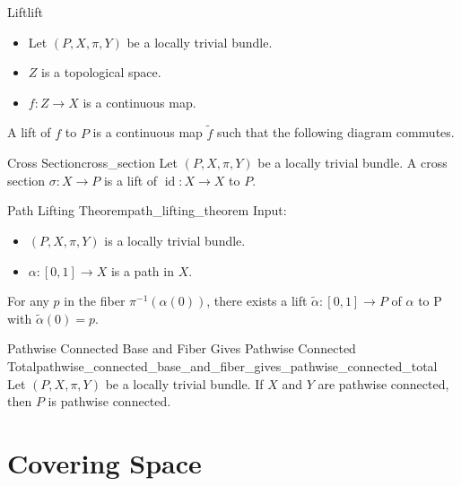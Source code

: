 \documentclass{article}
\begin{document}
\begin{definition}{Lift}{lift}
    \begin{itemize}
        \item Let $(P,X,\pi,Y)$ be a locally trivial bundle.
        \item $Z$ is a topological space.
        \item $f:Z\rightarrow X$ is a continuous map.
    \end{itemize}
    A lift of $f$ to $P$ is a continuous map $\tilde{f}$ such that the following diagram commutes.
    \begin{center}
    \end{center}
\end{definition}

\begin{definition}{Cross Section}{cross_section}
    Let $(P,X,\pi,Y)$ be a locally trivial bundle.
    A cross section $\sigma:X\rightarrow P$ is a lift of $\operatorname{id}:X\rightarrow X$ to $P$.
\end{definition}

\begin{theorem}{Path Lifting Theorem}{path_lifting_theorem}
    Input:
    \begin{itemize}
        \item $(P,X,\pi,Y)$ is a locally trivial bundle.
        \item $\alpha:[0,1]\rightarrow X$ is a path in $X$.
    \end{itemize}
    For any $p$ in the fiber $\pi^{-1}(\alpha(0))$, there exists a lift $\tilde{\alpha}:[0,1]\rightarrow P$ of $\alpha$ to P with $\tilde{\alpha}(0) = p$.
\end{theorem}

\begin{theorem}{Pathwise Connected Base and Fiber Gives Pathwise Connected Total}{pathwise_connected_base_and_fiber_gives_pathwise_connected_total}
    Let $(P,X,\pi,Y)$ be a locally trivial bundle.
    If $X$ and $Y$ are pathwise connected, then $P$ is pathwise connected.
\end{theorem}

\section{Covering Space}
\end{document}
